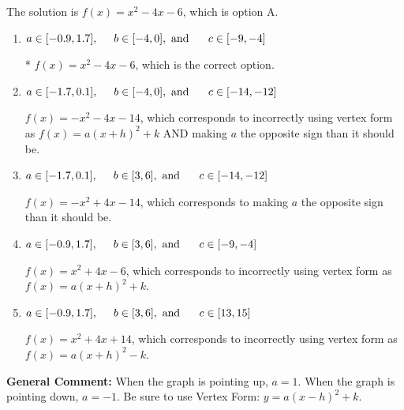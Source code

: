 \documentclass{extbook}[14pt]
\begin{document}
\begin{enumerate}
{The solution is \( f(x) = x^{2} -4 x -6 \), which is option A.\begin{enumerate}[label=\Alph*.]
\item \( a \in [-0.9, 1.7], \hspace*{5mm} b \in [-4, 0], \text{ and } \hspace*{5mm} c \in [-9, -4] \)

* $f(x)=x^{2} -4 x -6$, which is the correct option.
\item \( a \in [-1.7, 0.1], \hspace*{5mm} b \in [-4, 0], \text{ and } \hspace*{5mm} c \in [-14, -12] \)

$f(x)=-x^{2} -4 x -14$, which corresponds to incorrectly using vertex form as $f(x) = a(x+h)^2+k$ AND making $a$ the opposite sign than it should be.
\item \( a \in [-1.7, 0.1], \hspace*{5mm} b \in [3, 6], \text{ and } \hspace*{5mm} c \in [-14, -12] \)

$f(x)=-x^{2} +4 x -14$, which corresponds to making $a$ the opposite sign than it should be.
\item \( a \in [-0.9, 1.7], \hspace*{5mm} b \in [3, 6], \text{ and } \hspace*{5mm} c \in [-9, -4] \)

$f(x)=x^{2} +4 x -6$, which corresponds to incorrectly using vertex form as $f(x) = a(x+h)^2+k$.
\item \( a \in [-0.9, 1.7], \hspace*{5mm} b \in [3, 6], \text{ and } \hspace*{5mm} c \in [13, 15] \)

$f(x)=x^{2} +4 x + 14$, which corresponds to incorrectly using vertex form as $f(x) = a(x+h)^2 - k$.
\end{enumerate}

\textbf{General Comment:} When the graph is pointing up, $a=1$. When the graph is pointing down, $a=-1$. Be sure to use Vertex Form: $y = a(x-h)^2+k$.
}
\end{enumerate}
\end{document}
